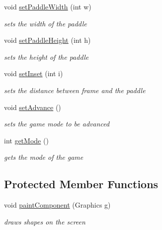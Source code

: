 \begin{DoxyCompactItemize}
void \hyperlink{classview_1_1_pong_game_display_ac42d38f9ed29e2ab2bec6c7da46f1c0e}{set\+Paddle\+Width} (int w)
\begin{DoxyCompactList}\small\item\em sets the width of the paddle \end{DoxyCompactList}\item 
void \hyperlink{classview_1_1_pong_game_display_a5c855e1e459838b82e976cd957da5cc5}{set\+Paddle\+Height} (int h)
\begin{DoxyCompactList}\small\item\em sets the height of the paddle \end{DoxyCompactList}\item 
void \hyperlink{classview_1_1_pong_game_display_ac40ce3811b6118c530980d38aa48ec64}{set\+Inset} (int i)
\begin{DoxyCompactList}\small\item\em sets the distance between frame and the paddle \end{DoxyCompactList}\item 
void \hyperlink{classview_1_1_pong_game_display_a0fedbf41897932915b12f67542cb7695}{set\+Advance} ()
\begin{DoxyCompactList}\small\item\em sets the game mode to be advanced \end{DoxyCompactList}\item 
int \hyperlink{classview_1_1_pong_game_display_aca0afcedba1c0868113edcf0caa63263}{get\+Mode} ()
\begin{DoxyCompactList}\small\item\em gets the mode of the game \end{DoxyCompactList}\end{DoxyCompactItemize}
\subsection*{Protected Member Functions}
\begin{DoxyCompactItemize}
\item 
void \hyperlink{classview_1_1_pong_game_display_a0e3a18dfc9bbd76c97439a618a3330ac}{paint\+Component} (Graphics g)
\begin{DoxyCompactList}\small\item\em draws shapes on the screen \end{DoxyCompactList}\end{DoxyCompactItemize}
